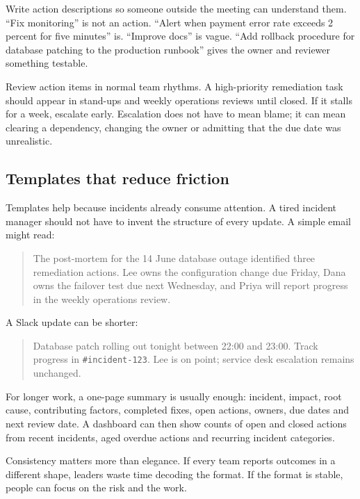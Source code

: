 Write action descriptions so someone outside the meeting can understand them. ``Fix monitoring'' is not an action. ``Alert when payment error rate exceeds 2 percent for five minutes'' is. ``Improve docs'' is vague. ``Add rollback procedure for database patching to the production runbook'' gives the owner and reviewer something testable.


Review action items in normal team rhythms. A high-priority remediation task should appear in stand-ups and weekly operations reviews until closed. If it stalls for a week, escalate early. Escalation does not have to mean blame; it can mean clearing a dependency, changing the owner or admitting that the due date was unrealistic.



\subsection{Templates that reduce friction}


Templates help because incidents already consume attention. A tired incident manager should not have to invent the structure of every update. A simple email might read:



\begin{quote}\small
The post-mortem for the 14 June database outage identified three remediation actions. Lee owns the configuration change due Friday, Dana owns the failover test due next Wednesday, and Priya will report progress in the weekly operations review.
\end{quote}


A Slack update can be shorter:



\begin{quote}\small
Database patch rolling out tonight between 22:00 and 23:00. Track progress in \texttt{\#incident-123}. Lee is on point; service desk escalation remains unchanged.
\end{quote}


For longer work, a one-page summary is usually enough: incident, impact, root cause, contributing factors, completed fixes, open actions, owners, due dates and next review date. A dashboard can then show counts of open and closed actions from recent incidents, aged overdue actions and recurring incident categories.


Consistency matters more than elegance. If every team reports outcomes in a different shape, leaders waste time decoding the format. If the format is stable, people can focus on the risk and the work.



